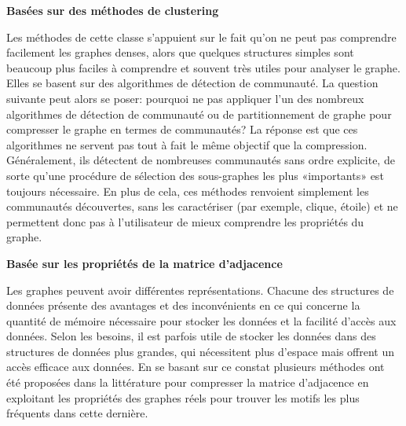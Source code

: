 \documentclass[a4paper,oneside,12pt]{report}
\theoremstyle{definition}
\begin{document}
					 \textbf{Basées sur des méthodes de clustering}
							
							Les méthodes de cette classe s'appuient sur le fait qu'on ne peut pas comprendre facilement les graphes denses, alors que quelques structures simples sont beaucoup plus faciles à comprendre et souvent très utiles pour analyser le graphe. Elles se basent sur des algorithmes de détection de communauté. 
							La question suivante peut alors se poser: pourquoi ne pas appliquer l'un des nombreux algorithmes de détection de communauté ou de partitionnement de graphe pour compresser le graphe en termes de communautés? La réponse est que ces algorithmes ne servent pas tout à fait le même objectif que la compression. Généralement, ils détectent de nombreuses communautés sans ordre explicite, de sorte qu'une procédure de sélection des sous-graphes les plus «importants» est toujours nécessaire. En plus de cela, ces méthodes renvoient simplement les communautés découvertes, sans les caractériser (par exemple, clique, étoile) et ne permettent donc pas à l'utilisateur de mieux comprendre les propriétés du graphe. 
							
							
							
							
							
							
			\newpage
					 \textbf{Basée sur les propriétés de la matrice d'adjacence}
							
							Les graphes peuvent avoir différentes représentations. Chacune des structures de données présente des avantages et des inconvénients en ce qui concerne la quantité de mémoire nécessaire pour stocker les données et la facilité d'accès aux données. Selon les besoins, il est parfois utile de stocker les données dans des structures de données plus grandes, qui nécessitent plus d'espace mais offrent un accès efficace aux données. En se basant sur ce constat plusieurs méthodes ont été  proposées dans la littérature pour compresser la matrice d'adjacence en exploitant les propriétés des graphes réels pour trouver les motifs les plus fréquents dans cette dernière.
							
							
							
					
				
\end{document}
